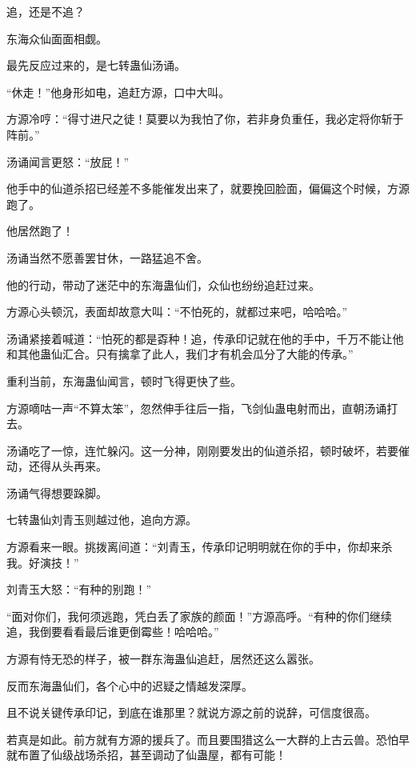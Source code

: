 
\begin{this_body}

追，还是不追？

东海众仙面面相觑。

最先反应过来的，是七转蛊仙汤诵。

“休走！”他身形如电，追赶方源，口中大叫。

方源冷哼：“得寸进尺之徒！莫要以为我怕了你，若非身负重任，我必定将你斩于阵前。”

汤诵闻言更怒：“放屁！”

他手中的仙道杀招已经差不多能催发出来了，就要挽回脸面，偏偏这个时候，方源跑了。

他居然跑了！

汤诵当然不愿善罢甘休，一路猛追不舍。

他的行动，带动了迷茫中的东海蛊仙们，众仙也纷纷追赶过来。

方源心头顿沉，表面却故意大叫：“不怕死的，就都过来吧，哈哈哈。”

汤诵紧接着喊道：“怕死的都是孬种！追，传承印记就在他的手中，千万不能让他和其他蛊仙汇合。只有擒拿了此人，我们才有机会瓜分了大能的传承。”

重利当前，东海蛊仙闻言，顿时飞得更快了些。

方源嘀咕一声“不算太笨”，忽然伸手往后一指，飞剑仙蛊电射而出，直朝汤诵打去。

汤诵吃了一惊，连忙躲闪。这一分神，刚刚要发出的仙道杀招，顿时破坏，若要催动，还得从头再来。

汤诵气得想要跺脚。

七转蛊仙刘青玉则越过他，追向方源。

方源看来一眼。挑拨离间道：“刘青玉，传承印记明明就在你的手中，你却来杀我。好演技！”

刘青玉大怒：“有种的别跑！”

“面对你们，我何须逃跑，凭白丢了家族的颜面！”方源高呼。“有种的你们继续追，我倒要看看最后谁更倒霉些！哈哈哈。”

方源有恃无恐的样子，被一群东海蛊仙追赶，居然还这么嚣张。

反而东海蛊仙们，各个心中的迟疑之情越发深厚。

且不说关键传承印记，到底在谁那里？就说方源之前的说辞，可信度很高。

若真是如此。前方就有方源的援兵了。而且要围猎这么一大群的上古云兽。恐怕早就布置了仙级战场杀招，甚至调动了仙蛊屋，都有可能！


\end{this_body}
